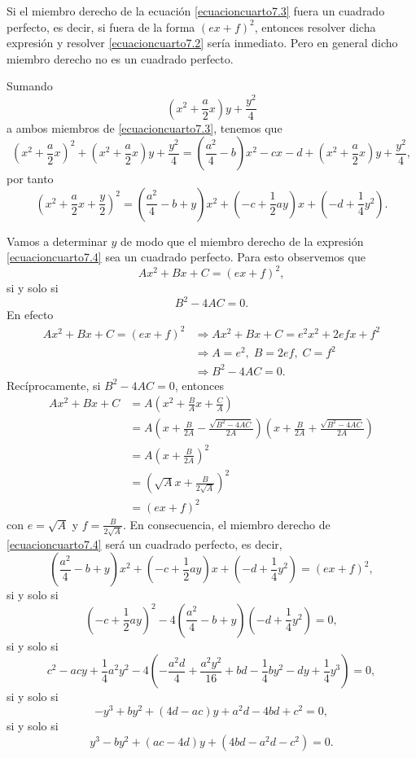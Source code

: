Si el miembro derecho de la ecuación \eqref{ecuacioncuarto7.3} fuera un cuadrado perfecto, es decir, si fuera de la forma $(ex+f)^2$, entonces resolver dicha expresión y resolver \eqref{ecuacioncuarto7.2} sería inmediato. Pero en general dicho miembro derecho no es un cuadrado perfecto.

Sumando
$$\left( x^2+\frac{a}{2}x \right) y + \frac{y^2}{4}$$
a ambos miembros de \eqref{ecuacioncuarto7.3}, tenemos que
$$\left( x^2+\frac{a}{2}x \right)^2 + \left( x^2+\frac{a}{2}x \right) y + \frac{y^2}{4} = \left( \frac{a^2}{4}-b \right) x^2-cx-d + \left( x^2+\frac{a}{2}x \right) y + \frac{y^2}{4},$$
por tanto
\begin{equation}
    \left( x^2+\frac{a}{2}x+\frac{y}{2} \right)^2 = \left( \frac{a^2}{4}-b+y \right) x^2 + \left( -c+\frac{1}{2} ay \right) x+ \left( -d + \frac{1}{4} y^2 \right). \label{ecuacioncuarto7.4}
\end{equation}

Vamos a determinar $y$ de modo que el miembro derecho de la expresión \eqref{ecuacioncuarto7.4} sea un cuadrado perfecto. Para esto observemos que
$$Ax^2+Bx+C=(ex+f)^2,$$
si y solo si
$$B^2-4AC=0.$$
En efecto
\begin{align*}
    Ax^2+Bx+C=(ex+f)^2 & \Longrightarrow Ax^2+Bx+C=e^2x^2+2efx+f^2 \\ 
    & \Longrightarrow A=e^2, \; B=2ef, \; C=f^2 \\ 
    & \Longrightarrow B^2-4AC=0.
\end{align*}
Recíprocamente, si $B^2-4AC=0$, entonces
\begin{align*}
    Ax^2+Bx+C &=A \left( x^2+\frac{B}{A}x+\frac{C}{A} \right) \\
    &=A \left( x+\frac{B}{2A}-\frac{\sqrt{B^2-4AC}}{2A} \right) \left( x+\frac{B}{2A}+\frac{\sqrt{B^2-4AC}}{2A} \right) \\
    &=A \left( x+\frac{B}{2A} \right)^2 \\
    &=\left( \sqrt{A}x+\frac{B}{2\sqrt{A}} \right)^2 \\
    &=(ex+f)^2
\end{align*}
con $e=\sqrt{A}$ y $\displaystyle f=\frac{B}{2\sqrt{A}}$. En consecuencia, el miembro derecho de \eqref{ecuacioncuarto7.4} será un cuadrado perfecto, es decir,
$$\left( \frac{a^2}{4}-b+y \right) x^2+\left( -c+\frac{1}{2}ay \right) x + \left( -d+\frac{1}{4}y^2 \right) = (ex+f)^2,$$
si y solo si
$$\left( -c+\frac{1}{2}ay \right)^2 -4 \left( \frac{a^2}{4}-b+y \right) \left( -d+\frac{1}{4}y^2 \right) =0,$$
si y solo si
$$c^2-acy+\frac{1}{4}a^2y^2-4 \left( -\frac{a^2d}{4}+\frac{a^2y^2}{16}+bd-\frac{1}{4}by^2-dy+\frac{1}{4} y^3 \right) =0,$$
si y solo si
$$-y^3+by^2+(4d-ac)y+a^2d-4bd+c^2=0,$$
si y solo si
\begin{equation}
    y^3-by^2+(ac-4d)y+\left(4bd-a^2d-c^2\right)=0. \label{ecuacioncuarto7.5}
\end{equation}

